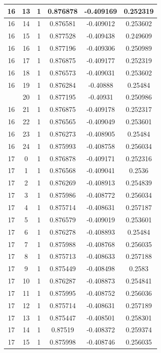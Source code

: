 \documentclass[12pt,a4paper]{article}
\numberwithin{equation}{section}
\numberwithin{figure}{section}
\numberwithin{table}{section}
\begin{document}
\begin{longtable}{|c|c|c|c|c|c|}
16 & 13 & 1 & 0.876878 & -0.409169 & 0.252319 \\ \hline
16 & 14 & 1 & 0.876581 & -0.409012 & 0.253602 \\ \hline
16 & 15 & 1 & 0.877528 & -0.409438 & 0.249609 \\ \hline
16 & 16 & 1 & 0.877196 & -0.409306 & 0.250989 \\ \hline
16 & 17 & 1 & 0.876875 & -0.409177 & 0.252319 \\ \hline
16 & 18 & 1 & 0.876573 & -0.409031 & 0.253602 \\ \hline
16 & 19 & 1 & 0.876284 & -0.40888 & 0.25484 \\ \hline
\pagebreak
16 & 20 & 1 & 0.877195 & -0.40931 & 0.250986 \\ \hline
16 & 21 & 1 & 0.876875 & -0.409178 & 0.252317 \\ \hline
16 & 22 & 1 & 0.876565 & -0.409049 & 0.253601 \\ \hline
16 & 23 & 1 & 0.876273 & -0.408905 & 0.25484 \\ \hline
16 & 24 & 1 & 0.875993 & -0.408758 & 0.256034 \\ \hline
17 & 0 & 1 & 0.876878 & -0.409171 & 0.252316 \\ \hline
17 & 1 & 1 & 0.876568 & -0.409041 & 0.2536 \\ \hline
17 & 2 & 1 & 0.876269 & -0.408913 & 0.254839 \\ \hline
17 & 3 & 1 & 0.875986 & -0.408772 & 0.256034 \\ \hline
17 & 4 & 1 & 0.875714 & -0.408631 & 0.257187 \\ \hline
17 & 5 & 1 & 0.876579 & -0.409019 & 0.253601 \\ \hline
17 & 6 & 1 & 0.876278 & -0.408893 & 0.25484 \\ \hline
17 & 7 & 1 & 0.875988 & -0.408768 & 0.256035 \\ \hline
17 & 8 & 1 & 0.875713 & -0.408633 & 0.257188 \\ \hline
17 & 9 & 1 & 0.875449 & -0.408498 & 0.2583 \\ \hline
17 & 10 & 1 & 0.876287 & -0.408873 & 0.254841 \\ \hline
17 & 11 & 1 & 0.875995 & -0.408752 & 0.256036 \\ \hline
17 & 12 & 1 & 0.875714 & -0.408631 & 0.257189 \\ \hline
17 & 13 & 1 & 0.875447 & -0.408501 & 0.258301 \\ \hline
17 & 14 & 1 & 0.87519 & -0.408372 & 0.259374 \\ \hline
17 & 15 & 1 & 0.875998 & -0.408746 & 0.256035 \\ \hline

\end{longtable}
\end{document}
